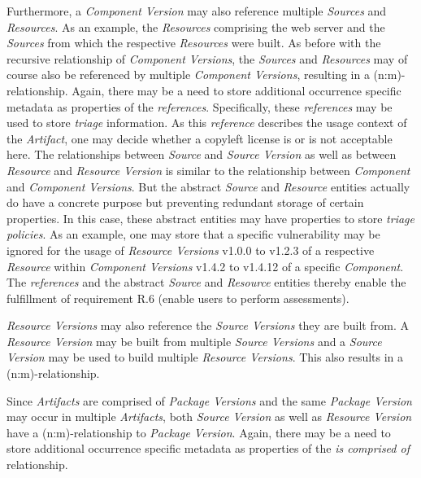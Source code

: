 Furthermore, a \emph{Component Version} may also reference multiple \emph{Sources} and \emph{Resources}. As an example, the \emph{Resources} comprising the web server and the \emph{Sources} from which the respective \emph{Resources} were built. As before with the recursive relationship of \emph{Component Versions}, the \emph{Sources} and \emph{Resources} may of course also be referenced by multiple \emph{Component Versions}, resulting in a (n:m)-relationship. Again, there may be a need to store additional occurrence specific metadata as properties of the \emph{references}. Specifically, these \emph{references} may be used to store \emph{triage} information. As this \emph{reference} describes the usage context of the \emph{Artifact}, one may decide whether a copyleft license is or is not acceptable here. The relationships between \emph{Source} and \emph{Source Version} as well as between \emph{Resource} and \emph{Resource Version} is similar to the relationship between \emph{Component} and \emph{Component Versions}. But the abstract \emph{Source} and \emph{Resource} entities actually do have a concrete purpose but preventing redundant storage of certain properties. In this case, these abstract entities may have properties to store \emph{triage policies}. As an example, one may store that a specific vulnerability may be ignored for the usage of \emph{Resource Versions} v1.0.0 to v1.2.3 of a respective \emph{Resource} within \emph{Component Versions} v1.4.2 to v1.4.12 of a specific \emph{Component}. The \emph{references} and the abstract \emph{Source} and \emph{Resource} entities thereby enable the fulfillment of requirement R.6 (enable users to perform assessments).\par 
\emph{Resource Versions} may also reference the \emph{Source Versions} they are built from. A \emph{Resource Version} may be built from multiple \emph{Source Versions} and a \emph{Source Version} may be used to build multiple \emph{Resource Versions}. This also results in a (n:m)-relationship.\par
Since \emph{Artifacts} are comprised of \emph{Package Versions} and the same \emph{Package Version} may occur in multiple \emph{Artifacts}, both \emph{Source Version} as well as \emph{Resource Version} have a (n:m)-relationship to \emph{Package Version}. Again, there may be a need to store additional occurrence specific metadata as properties of the \emph{is comprised of} relationship.\par
